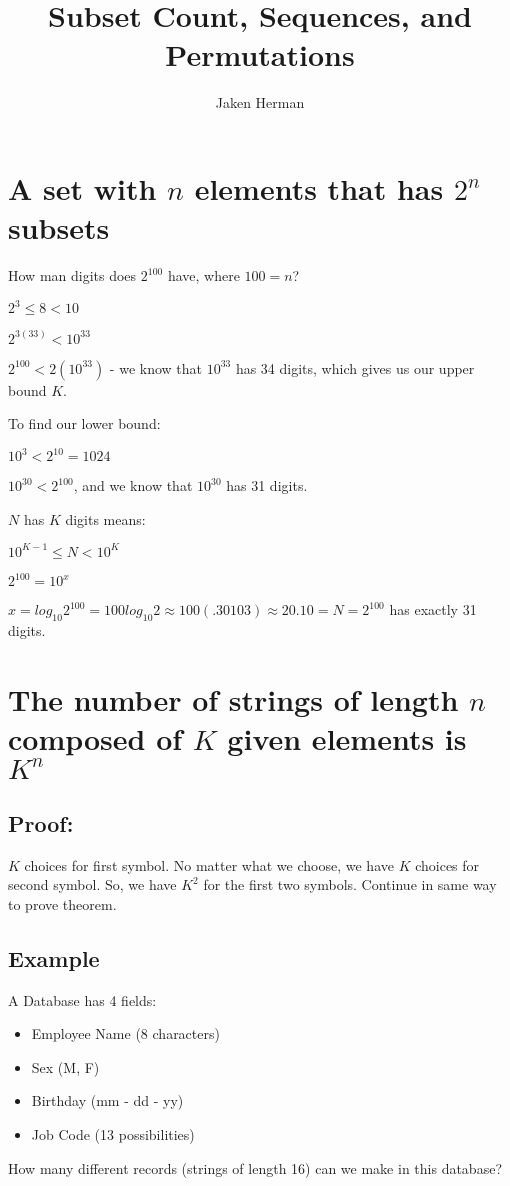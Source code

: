 \documentclass{article}
\title{Subset Count, Sequences, and Permutations}
\author{Jaken Herman}
\begin{document}
\maketitle	

\section{A set with $n$ elements that has $2^n$ subsets}
How man digits does $2^100$ have, where $100 = n$?

$2^3 \leq 8 < 10$


$2^{3(33)} < 10^{33}$


$2^{100} < 2(10^{33})$ - we know that $10^{33}$ has 34 digits, which gives us our upper bound $K$.

To find our lower bound:

$10^3 < 2^{10} = 1024$

$10^{30} < 2^{100}$, and we know that $10^{30}$ has 31 digits.

$N$ has $K$ digits means:

$10^{K-1} \leq N < 10^K$

$2^{100} = 10^x$

$x = log_{10}2^{100} = 100log_{10}2 \approx 100(.30103) \approx 20.10 = N = 2^{100}$ has exactly 31 digits.

\section{The number of strings of length $n$ composed of $K$ given elements is $K^n$}
\subsection{Proof: }
$K$ choices for first symbol. No matter what we choose, we have $K$ choices for second symbol. So, we have $K^2$ for the first two symbols. Continue in same way to prove theorem.
\subsection{Example}
A Database has 4 fields: 
\begin{itemize}
 \item{Employee Name (8 characters)}
 \item{Sex (M, F)}
 \item{Birthday (mm - dd - yy)}
 \item{Job Code (13 possibilities)}
\end{itemize}
How many different records (strings of length 16) can we make in this database?
\end{document}
